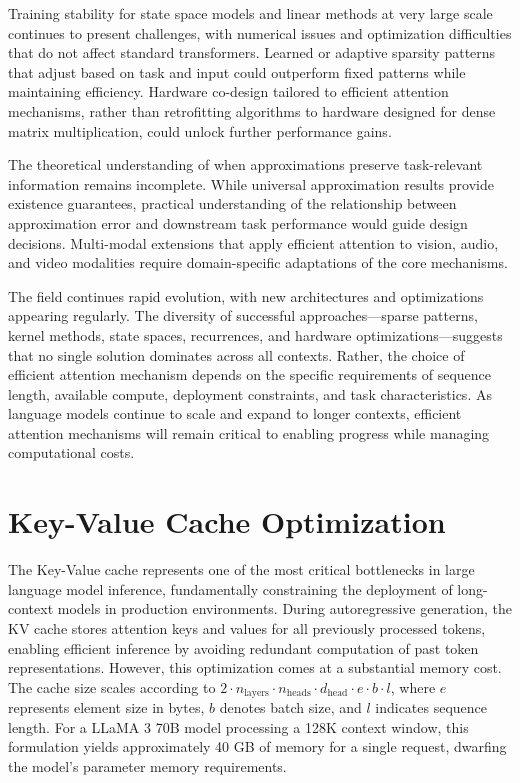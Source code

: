 Training stability for state space models and linear methods at very large scale continues to present challenges, with numerical issues and optimization difficulties that do not affect standard transformers. Learned or adaptive sparsity patterns that adjust based on task and input could outperform fixed patterns while maintaining efficiency. Hardware co-design tailored to efficient attention mechanisms, rather than retrofitting algorithms to hardware designed for dense matrix multiplication, could unlock further performance gains.

The theoretical understanding of when approximations preserve task-relevant information remains incomplete. While universal approximation results provide existence guarantees, practical understanding of the relationship between approximation error and downstream task performance would guide design decisions. Multi-modal extensions that apply efficient attention to vision, audio, and video modalities require domain-specific adaptations of the core mechanisms.

The field continues rapid evolution, with new architectures and optimizations appearing regularly. The diversity of successful approaches—sparse patterns, kernel methods, state spaces, recurrences, and hardware optimizations—suggests that no single solution dominates across all contexts. Rather, the choice of efficient attention mechanism depends on the specific requirements of sequence length, available compute, deployment constraints, and task characteristics. As language models continue to scale and expand to longer contexts, efficient attention mechanisms will remain critical to enabling progress while managing computational costs.
\section{Key-Value Cache Optimization}
\label{sec:kvcache}

The Key-Value cache represents one of the most critical bottlenecks in large language model inference, fundamentally constraining the deployment of long-context models in production environments. During autoregressive generation, the KV cache stores attention keys and values for all previously processed tokens, enabling efficient inference by avoiding redundant computation of past token representations. However, this optimization comes at a substantial memory cost. The cache size scales according to $2 \cdot n_{\text{layers}} \cdot n_{\text{heads}} \cdot d_{\text{head}} \cdot e \cdot b \cdot l$, where $e$ represents element size in bytes, $b$ denotes batch size, and $l$ indicates sequence length. For a LLaMA 3 70B model processing a 128K context window, this formulation yields approximately 40 GB of memory for a single request, dwarfing the model's parameter memory requirements.

